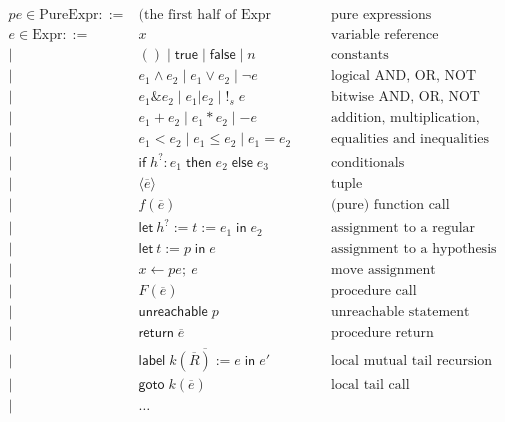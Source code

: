 \documentclass[acmsmall,nonacm]{acmart}
\begin{document}
\begin{align*}
  pe\in \mathrm{PureExpr} ::={}&\mbox{(the first half of Expr below)}&&\mbox{pure expressions}\\
  e \in \mathrm{Expr} ::={}& x&&\mbox{variable reference}\\
    \mid{}&()\mid \mathsf{true}\mid \mathsf{false}\mid n&&\mbox{constants}\\
    \mid{}&e_1 \land e_2\mid e_1 \lor e_2\mid \neg e&&\mbox{logical AND, OR, NOT}\\
    \mid{}&e_1 \mathbin\texttt{\&} e_2\mid e_1 \mathbin\texttt{|} e_2\mid \texttt{!}_s\; e&&\mbox{bitwise AND, OR, NOT}\\
    \mid{}&e_1 + e_2\mid e_1 * e_2\mid -e&&\mbox{addition, multiplication, negation}\\
    \mid{}&e_1 < e_2\mid e_1 \le e_2\mid e_1 = e_2&&\mbox{equalities and inequalities}\\
    \mid{}&\mathsf{if}\;h^? : e_1\;\mathsf{then}\;e_2\;\mathsf{else}\;e_3&&\mbox{conditionals}\\
    \mid{}&\langle\overline{e}\rangle&&\mbox{tuple}\\
    \mid{}&f(\overline{e})&&\mbox{(pure) function call}\\[2mm]
%
    \mid{}&\mathsf{let}\ h^? := t := e_1\;\mathsf{in}\; e_2 &&\mbox{assignment to a regular variable}\\
    \mid{}& \mathsf{let}\ t := p\;\mathsf{in}\; e&&\mbox{assignment to a hypothesis}\\
    \mid{}& x \gets pe;\ e&&\mbox{move assignment}\\
    \mid{}&F(\overline{e})&&\mbox{procedure call}\\
    \mid{}&\mathsf{unreachable}\;p&&\mbox{unreachable statement}\\
    \mid{}&\mathsf{return}\; \overline{e}&&\mbox{procedure return}\\
    \mid{}&\mathsf{label}\;\overline{k(\overline{R}):=e}\;\mathsf{in}\;e'&&\mbox{local mutual tail recursion}\\
    \mid{}&\mathsf{goto}\;k(\overline{e})&&\mbox{local tail call}\\
    \mid{}&\dots\\
\end{align*}
\end{document}

